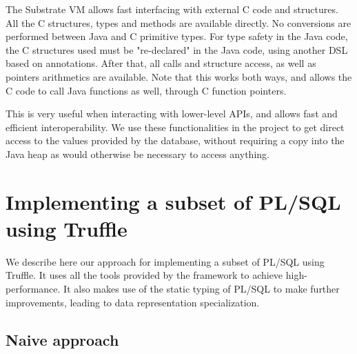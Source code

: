 \documentclass[twoside,11pt,a4paper]{article}
\newcommand{\maybe}[1]{\textit{(maybe ? #1)}}
\newcommand{\pls}[1]{\texttt{#1}}
\newcommand{\plstype}[1]{\pls{#1}}
\newcommand{\plsi}{\plstype{PLS\_INTEGER}}
\newcommand{\simpleint}{\plstype{SIMPLE\_INTEGER}}
\newcommand{\startsection}[1]{
	\cleardoublepage
	\section{#1}
	\thispagestyle{basic}
}
\begin{document}
The Substrate VM allows fast interfacing with external C code and structures. All the C structures, types and methods are available directly. No conversions are performed between Java and C primitive types. For type safety in the Java code, the C structures used must be "re-declared" in the Java code, using another DSL based on annotations. After that, all calls and structure access, as well as pointers arithmetics are available. Note that this works both ways, and allows the C code to call Java functions as well, through C function pointers.

This is very useful when interacting with lower-level APIs, and allows fast and efficient interoperability. We use these functionalities in the project to get direct access to the values provided by the database, without requiring a copy into the Java heap as would otherwise be necessary to access anything.

\startsection{Implementing a subset of PL/SQL using Truffle}
\thispagestyle{plain}

We describe here our approach for implementing a subset of PL/SQL using Truffle. It uses all the tools provided by the framework to achieve high-performance. It also makes use of the static typing of PL/SQL to make further improvements, leading to data representation specialization.


\subsection{Naive approach}

\end{document}
